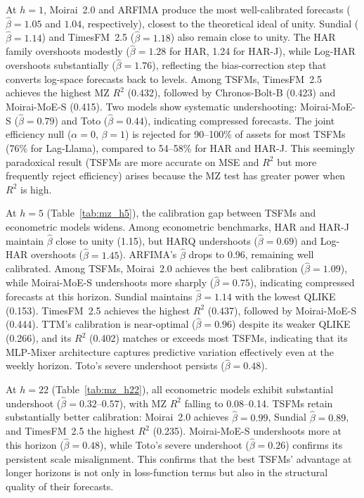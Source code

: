 \documentclass[12pt]{article}
\begin{document}
At $h = 1$, Moirai~2.0 and ARFIMA produce the most well-calibrated forecasts ($\hat{\beta} = 1.05$ and $1.04$, respectively), closest to the theoretical ideal of unity. Sundial ($\hat{\beta} = 1.14$) and TimesFM~2.5 ($\hat{\beta} = 1.18$) also remain close to unity. The HAR family overshoots modestly ($\hat{\beta} = 1.28$ for HAR, 1.24 for HAR-J), while Log-HAR overshoots substantially ($\hat{\beta} = 1.76$), reflecting the bias-correction step that converts log-space forecasts back to levels. Among TSFMs, TimesFM~2.5 achieves the highest MZ $R^2$ (0.432), followed by Chronos-Bolt-B (0.423) and Moirai-MoE-S (0.415). Two models show systematic undershooting: Moirai-MoE-S ($\hat{\beta} = 0.79$) and Toto ($\hat{\beta} = 0.44$), indicating compressed forecasts. The joint efficiency null ($\alpha = 0$, $\beta = 1$) is rejected for 90--100\% of assets for most TSFMs (76\% for Lag-Llama), compared to 54--58\% for HAR and HAR-J. This seemingly paradoxical result (TSFMs are more accurate on MSE and $R^2$ but more frequently reject efficiency) arises because the MZ test has greater power when $R^2$ is high.



At $h = 5$ (Table~\ref{tab:mz_h5}), the calibration gap between TSFMs and econometric models widens. Among econometric benchmarks, HAR and HAR-J maintain $\hat{\beta}$ close to unity (1.15), but HARQ undershoots ($\hat{\beta} = 0.69$) and Log-HAR overshoots ($\hat{\beta} = 1.45$). ARFIMA's $\hat{\beta}$ drops to 0.96, remaining well calibrated. Among TSFMs, Moirai~2.0 achieves the best calibration ($\hat{\beta} = 1.09$), while Moirai-MoE-S undershoots more sharply ($\hat{\beta} = 0.75$), indicating compressed forecasts at this horizon. Sundial maintains $\hat{\beta} = 1.14$ with the lowest QLIKE (0.153). TimesFM~2.5 achieves the highest $R^2$ (0.437), followed by Moirai-MoE-S (0.444). TTM's calibration is near-optimal ($\hat{\beta} = 0.96$) despite its weaker QLIKE (0.266), and its $R^2$ (0.402) matches or exceeds most TSFMs, indicating that its MLP-Mixer architecture captures predictive variation effectively even at the weekly horizon. Toto's severe undershoot persists ($\hat{\beta} = 0.48$).



At $h = 22$ (Table~\ref{tab:mz_h22}), all econometric models exhibit substantial undershoot ($\hat{\beta} = 0.32$--$0.57$), with MZ $R^2$ falling to 0.08--0.14. TSFMs retain substantially better calibration: Moirai~2.0 achieves $\hat{\beta} = 0.99$, Sundial $\hat{\beta} = 0.89$, and TimesFM~2.5 the highest $R^2$ (0.235). Moirai-MoE-S undershoots more at this horizon ($\hat{\beta} = 0.48$), while Toto's severe undershoot ($\hat{\beta} = 0.26$) confirms its persistent scale misalignment. This confirms that the best TSFMs' advantage at longer horizons is not only in loss-function terms but also in the structural quality of their forecasts.
\end{document}

